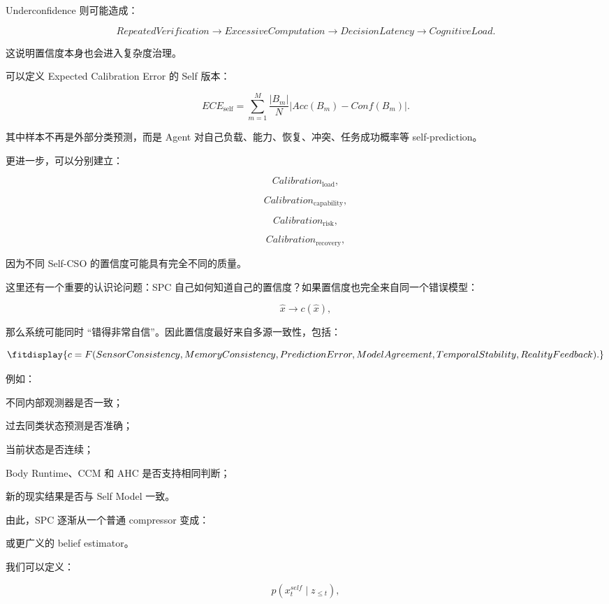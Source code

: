 Underconfidence 则可能造成：

\[
RepeatedVerification
\rightarrow
ExcessiveComputation
\rightarrow
DecisionLatency
\rightarrow
CognitiveLoad.
\]

这说明置信度本身也会进入复杂度治理。

可以定义 Expected Calibration Error 的 Self 版本：

\[
ECE_{\mathrm{self}}
=
\sum_{m=1}^{M}
\frac{|B_m|}{N}
\left|
Acc(B_m)-Conf(B_m)
\right|.
\]

其中样本不再是外部分类预测，而是 Agent 对自己负载、能力、恢复、冲突、任务成功概率等 self-prediction。

更进一步，可以分别建立：

\[
Calibration_{\mathrm{load}},
\]

\[
Calibration_{\mathrm{capability}},
\]

\[
Calibration_{\mathrm{risk}},
\]

\[
Calibration_{\mathrm{recovery}},
\]

因为不同 Self-CSO 的置信度可能具有完全不同的质量。

这里还有一个重要的认识论问题：SPC 自己如何知道自己的置信度？如果置信度也完全来自同一个错误模型：

\[
\hat{x}
\rightarrow
c(\hat{x}),
\]

那么系统可能同时 ``错得非常自信''。因此置信度最好来自多源一致性，包括：

\[
\fitdisplay{
c
=
F(
SensorConsistency,
MemoryConsistency,
PredictionError,
ModelAgreement,
TemporalStability,
RealityFeedback
).
}
\]

例如：

不同内部观测器是否一致；

过去同类状态预测是否准确；

当前状态是否连续；

Body Runtime、CCM 和 AHC 是否支持相同判断；

新的现实结果是否与 Self Model 一致。

由此，SPC 逐渐从一个普通 compressor 变成：

\begin{statementbox}
\centering
{}
\end{statementbox}

或更广义的 belief estimator。

我们可以定义：

\[
p(x_t^{self}\mid z_{\leq t}),
\]

